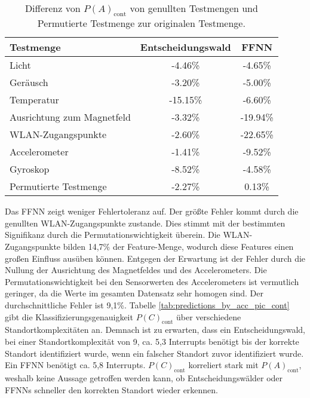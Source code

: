 \begin{table}[h!]
    \centering
    \begin{tabular}{ | l | c | c | }
        \hline
        Testmenge & Entscheidungswald & FFNN \\\hline
        Licht & -4.46\% & -4.65\% \\\hline
        Geräusch & -3.20\% & -5.00\% \\\hline
        Temperatur & -15.15\% & -6.60\% \\\hline
        Ausrichtung zum Magnetfeld & -3.32\% & -19.94\% \\\hline
        WLAN-Zugangspunkte & -2.60\% & -22.65\% \\\hline
        Accelerometer & -1.41\% & -9.52\% \\\hline
        Gyroskop & -8.52\% & -4.58\% \\\hline
        Permutierte Testmenge & -2.27\% & 0.13\% \\\hline
    \end{tabular}
    \caption{Differenz von $P(A)_{\text{cont}}$ von genullten Testmengen und Permutierte Testmenge zur originalen Testmenge.}
    \label{tab:robustness_by_acc_cont}
\end{table}
\newline
\newline
Das FFNN zeigt weniger Fehlertoleranz auf.
Der größte Fehler kommt durch die genullten WLAN-Zugangspunkte zustande.
Dies stimmt mit der bestimmten Signifikanz durch die Permutationswichtigkeit überein.
Die WLAN-Zugangspunkte bilden 14,7\% der Feature-Menge, wodurch diese Features einen großen Einfluss ausüben können.
\newline
Entgegen der Erwartung ist der Fehler durch die Nullung der Ausrichtung des Magnetfeldes und des Accelerometers.
Die Permutationswichtigkeit bei den Sensorwerten des Accelerometers ist vermutlich geringer,
da die Werte im gesamten Datensatz sehr homogen sind.
Der durchschnittliche Fehler ist 9,1\%.
\newline
\newline
Tabelle \ref{tab:predictions_by_acc_pic_cont} gibt die Klassifizierungsgenauigkeit $P(C)_{\text{cont}}$ über verschiedene Standortkomplexitäten an.
Demnach ist zu erwarten, dass ein Entscheidungswald, bei einer Standortkomplexität von 9, ca. 5,3 Interrupts benötigt bis der korrekte Standort identifiziert wurde,
wenn ein falscher Standort zuvor identifiziert wurde.
Ein FFNN benötigt ca. 5,8 Interrupts.
$P(C)_{\text{cont}}$ korreliert stark mit $P(A)_{\text{cont}}$, weshalb keine Aussage getroffen werden kann, ob Entscheidungswälder oder FFNNs schneller den korrekten Standort wieder erkennen.
